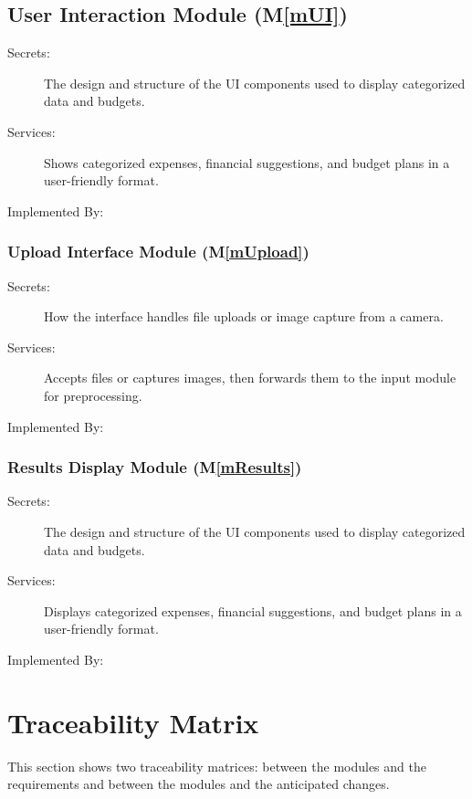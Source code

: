 \documentclass[12pt, titlepage]{article}
\newcommand{\mref}[1]{M\ref{#1}}
\begin{document}
\subsection{User Interaction Module (\mref{mUI})}

\begin{description}
\item[Secrets:] The design and structure of the UI components used to display categorized data and budgets.
\item[Services:] Shows categorized expenses, financial suggestions, and budget plans in a user-friendly format.
\item[Implemented By:] \progname
\end{description}

\subsubsection{Upload Interface Module (\mref{mUpload})}

\begin{description}
\item[Secrets:] How the interface handles file uploads or image capture from a camera.
\item[Services:] Accepts files or captures images, then forwards them to the input module for preprocessing.
\item[Implemented By:] \progname
\end{description}

\subsubsection{Results Display Module (\mref{mResults})}

\begin{description}
\item[Secrets:] The design and structure of the UI components used to display categorized data and budgets.
\item[Services:] Displays categorized expenses, financial suggestions, and budget plans in a user-friendly format.
\item[Implemented By:] \progname
\end{description}

\section{Traceability Matrix} \label{SecTM}

This section shows two traceability matrices: between the modules and the
requirements and between the modules and the anticipated changes.
\end{document}
